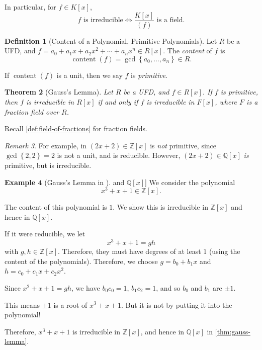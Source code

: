 \documentclass{article}
\newtheorem{theorem}{Theorem}[section]
\theoremstyle{definition}
\newtheorem{definition}[theorem]{Definition}
\newtheorem{example}[theorem]{Example}
\theoremstyle{remark}
\newtheorem{remark}[theorem]{Remark}
\newcommand{\pqty}[1]{\left(#1\right)}
\newcommand{\bqty}[1]{\left[#1\right]}
\newcommand{\Bqty}[1]{\left\{#1\right\}}
\newcommand{\flatfrac}[2]{\frac{#1}{#2}}
\newcommand{\ZZ}{\mathbb{Z}}
\newcommand{\QQ}{\mathbb{Q}}
\newcommand{\content}{\operatorname{content}}
\begin{document}
In particular, for \(f \in K\bqty{x}\),
\[
    f \text{ is irreducible} \iff \flatfrac{K\bqty{x}}{\pqty{f}} \text{ is a field}.
\]

\begin{definition}[Content of a Polynomial, Primitive Polynomials]
    \label{def:content-polynomial-primitive}%
    Let \(R\) be a UFD, and \(f = a_0 + a_1 x + a_2 x^2 + \cdots + a_n x^n\in R\bqty{x}\). The \emph{content} of \(f\) is
    \[
        \content\pqty{f} = \gcd\Bqty{a_0, \ldots, a_n} \in R.
    \]

    If \(\content\pqty{f}\) is a unit, then we say \(f\) is \emph{primitive}.
\end{definition}

\begin{theorem}[Gauss's Lemma]
    \label{thm:gauss-lemma}%
    Let \(R\) be a UFD, and \(f \in R\bqty{x}\). If \(f\) is primitive, then \(f\) is irreducible in \(R \bqty{x}\) if and only if \(f\) is irreducible in \(F\bqty{x}\), where \(F\) is a fraction field over \(R\).
\end{theorem}

Recall \autoref{def:field-of-fractions} for fraction fields.

\begin{remark}
    For example, in \(\pqty{2x + 2} \in \ZZ\bqty{x}\) is \emph{not} primitive, since \(\gcd\Bqty{2, 2} = 2\) is not a unit, and is reducible. However, \(\pqty{2x + 2} \in \QQ\bqty{x}\) \emph{is} primitive, but is irreducible.
\end{remark}

\begin{example}[Gauss's Lemma in \(\ZZ\bqty{x}\) and \(\QQ\bqty{x}\)]
    \label{ex:application-gausss-lemma}%
    We consider the polynomial
    \[
        x^3 + x + 1 \in \ZZ\bqty{x}.
    \]

    The content of this polynomial is \(1\). We show this is irreducible in \(\ZZ\bqty{x}\) and hence in \(\QQ\bqty{x}\).

    If it were reducible, we let
    \[
        x^3 + x + 1 = gh
    \]
    with \(g, h \in \ZZ\bqty{x}\). Therefore, they must have degrees of at least \(1\) (using the content of the polynomials). Therefore, we choose \(g = b_0 + b_1 x\) and \(h = c_0 + c_1 x + c_2 x^2\).

    Since \(x^2 + x + 1 = gh\), we have \(b_0 c_0 = 1\), \(b_1 c_2 = 1\), and so \(b_0\) and \(b_1\) are \(\pm 1\).
    
    This means \(\pm 1\) is a root of \(x^3 + x + 1\). But it is not by putting it into the polynomial!

    Therefore, \(x^3 + x + 1\) is irreducible in \(\ZZ\bqty{x}\), and hence in \(\QQ\bqty{x}\) in \autoref{thm:gauss-lemma}.
\end{example}
\end{document}
